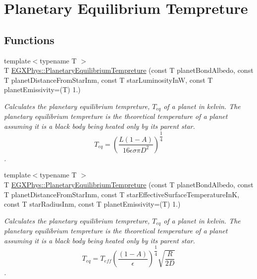 \hypertarget{group___e_g_x_phys-_astrophysics-_planetary_equilibrium_tempreture}{}\section{Planetary Equilibrium Tempreture}
\label{group___e_g_x_phys-_astrophysics-_planetary_equilibrium_tempreture}
\subsection*{Functions}
\begin{DoxyCompactItemize}
\item 
{\footnotesize template$<$typename T $>$ }\\T \mbox{\hyperlink{group___e_g_x_phys-_astrophysics-_planetary_equilibrium_tempreture_ga48b1c3c35c18036586685da25085d05b}{E\+G\+X\+Phys\+::\+Planetary\+Equilibrium\+Tempreture}} (const T planet\+Bond\+Albedo, const T planet\+Distance\+From\+Star\+Inm, const T star\+Luminosity\+InW, const T planet\+Emissivity=(T) 1.)
\begin{DoxyCompactList}\small\item\em Calculates the planetary equilibrium tempreture, $T_{eq}$ of a planet in kelvin. The planetary equilibrium tempreture is the theoretical temperature of a planet assuming it is a black body being heated only by its parent star. \[ T_{eq}=\left ( \dfrac{L (1-A)}{16 \epsilon \sigma \pi D^2} \right )^{\dfrac{1}{4}} \]. \end{DoxyCompactList}\item 
{\footnotesize template$<$typename T $>$ }\\T \mbox{\hyperlink{group___e_g_x_phys-_astrophysics-_planetary_equilibrium_tempreture_ga4a6704ad5d483e07453bcd01ba5f66c3}{E\+G\+X\+Phys\+::\+Planetary\+Equilibrium\+Tempreture}} (const T planet\+Bond\+Albedo, const T planet\+Distance\+From\+Star\+Inm, const T star\+Effective\+Surface\+Temperature\+InK, const T star\+Radius\+Inm, const T planet\+Emissivity=(T) 1.)
\begin{DoxyCompactList}\small\item\em Calculates the planetary equilibrium tempreture, $T_{eq}$ of a planet in kelvin. The planetary equilibrium tempreture is the theoretical temperature of a planet assuming it is a black body being heated only by its parent star. \[ T_{eq}=T_{eff} \left ( \dfrac{(1-A)}{\epsilon} \right )^{\dfrac{1}{4}} \sqrt{\dfrac{R}{2 D}} \]. \end{DoxyCompactList}\end{DoxyCompactItemize}


